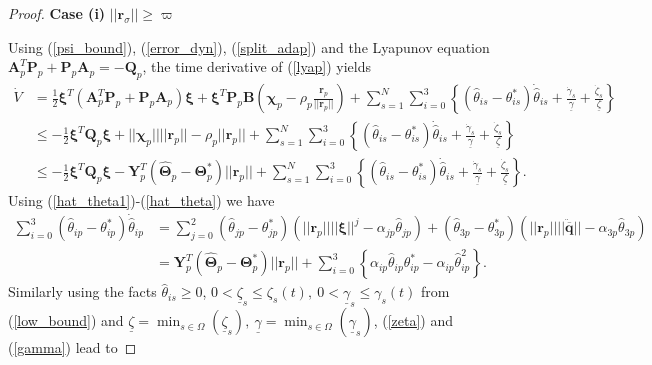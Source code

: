\begin{proof}
	\noindent\textbf{Case (i)} $|| \mathbf{r}_\sigma || \geq \varpi$
	
	Using (\ref{psi_bound}), (\ref{error_dyn}), (\ref{split_adap}) and the Lyapunov equation $\mathbf{A}_p^T \mathbf P_p + \mathbf {P}_p \mathbf A_p= -\mathbf Q_{p}$, the time derivative of (\ref{lyap}) yields
	\begin{align}
	\dot{V}  &= \frac{1}{2} \boldsymbol{\xi}^T(\mathbf{A}_p^T \mathbf P_p+ \mathbf {P}_p \mathbf A_p ) \boldsymbol{\xi}+ \boldsymbol \xi^T \mathbf {P}_p \mathbf B \left(\boldsymbol \chi_p -  {\rho_p}\frac{\mathbf r_p}{|| \mathbf r_p||}  \right) +\sum_{s=1}^{N} \sum_{i=0}^{3}\left \lbrace (\hat{\theta}_{is} -{\theta}_{is}^{*})\dot{\hat{\theta}}_{is}+ \frac{\dot{\gamma}_{s}}{ \underline{\gamma}} +\frac{\dot{\zeta}_{s}}{\underline{\zeta}} \right \rbrace \nonumber \\
	&\leq -\frac{1}{2} \boldsymbol{\xi}^T \mathbf Q_p\boldsymbol{\xi} + || \boldsymbol \chi_{p}  || || \mathbf{r}_p ||  - \rho_p{|| \mathbf r_p||} +\sum_{s=1}^{N} \sum_{i=0}^{3}\left \lbrace (\hat{\theta}_{is} -{\theta}_{is}^{*})\dot{\hat{\theta}}_{is}+ \frac{\dot{\gamma}_{s}}{ \underline{\gamma}} +\frac{\dot{\zeta}_{s}}{\underline{\zeta}}\right \rbrace \\%
	& \leq  - \frac{1}{2} \boldsymbol{\xi}^T \mathbf Q_p\boldsymbol{\xi}  - \mathbf{Y}^T_p(\hat{\boldsymbol \Theta}_p-\boldsymbol \Theta_p^{*})  || \mathbf{r}_p || +\sum_{s=1}^{N} \sum_{i=0}^{3}\left \lbrace (\hat{\theta}_{is} -{\theta}_{is}^{*})\dot{\hat{\theta}}_{is}+ \frac{\dot{\gamma}_{s}}{ \underline{\gamma}} +\frac{\dot{\zeta}_{s}}{\underline{\zeta}} \right \rbrace. \label{part 2}
	\end{align}
	Using (\ref{hat_theta1})-(\ref{hat_theta})  we have 
	\begin{align}
	\sum_{i=0}^{3}(\hat{\theta}_{ip}-{\theta}_{ip}^{*})\dot{\hat{\theta}}_{ip} & =\sum_{j=0}^{2} (\hat{\theta}_{jp}-{\theta}_{jp}^{*})(|| \mathbf{r}_p || || \boldsymbol \xi ||^{j} - \alpha_{jp}{\hat{\theta}}_{j p})+ (\hat{\theta}_{3p}-{\theta}_{3p}^{*})(|| \mathbf{r}_p || || \ddot{\overline{\mathbf q}} || - \alpha_{3p}{\hat{\theta}}_{3p}) \nonumber\\
	&  = \mathbf{Y}^T_p(\hat{\boldsymbol \Theta}_p-\boldsymbol \Theta_p^{*})  || \mathbf{r}_p ||   + \sum_{i=0}^{3} \left \lbrace\alpha_{ip}{\hat{\theta}}_{ip}{\theta}_{ip}^{*} -\alpha_{ip}{\hat{\theta}}_{ip}^2 \right \rbrace. \label{part 3}
	\end{align}
	Similarly using the facts $\hat{\theta}_{is} \geq 0$, $0< \underline{\zeta}_{s} \leq \zeta_{s}(t),~0< \underline{\gamma}_{s} \leq \gamma_{s}(t)$ from (\ref{low_bound}) and $\underline{\zeta}=\min_{s \in \Omega} ( \underline{\zeta}_{s} ),~\underline{\gamma}=\min_{s \in \Omega} ( \underline{\gamma}_{s} )$, (\ref{zeta}) and (\ref{gamma}) lead to

\end{proof}
